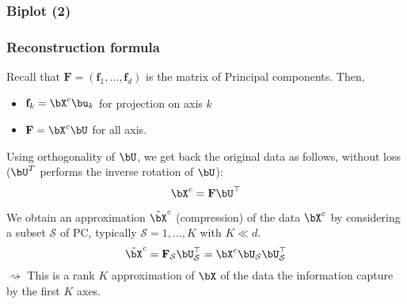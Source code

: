 \begin{frame}[fragile]
  \frametitle{Biplot (2)}
\begin{knitrout}
\color{fgcolor}
\end{knitrout}
\end{frame}

\begin{frame}
  \frametitle{Reconstruction formula}

    Recall that $\mathbf{F} = (\mathbf{f}_1, \dots, \mathbf{f}_d) $ is the matrix of Principal components. Then,  
    \begin{itemize}
      \item  $\mathbf{f}_k = \bX^c \bu_k$ for projection on axis $k$
      \item $\mathbf{F} = \bX^c \bU$ for all axis.
    \end{itemize}
    Using orthogonality of $\bU$, we get back the original data as follows, without loss ($\bU^T$ performs the inverse rotation of $\bU$):
    \begin{equation*}
      \bX^c = \mathbf{F}\bU^\top 
    \end{equation*}

    \vfill
    \pause 
    
    We obtain an approximation $\tilde\bX^c$ (compression) of the data $\bX^c$ by considering a subset $\mathcal{S}$ of PC, typically $\mathcal{S} = {1, \dots,K}$ with $K \ll d$.
    \begin{equation*}
      \tilde\bX^c = \mathbf{F}_{\mathcal{S}}\bU_{\mathcal{S}}^\top = \bX^c \bU_{\mathcal{S}} \bU_{\mathcal{S}}^\top
    \end{equation*}
    $\rightsquigarrow$ This is a rank $K$ approximation of $\bX$ of the data the information capture by the first $K$ axes.

\end{frame}

